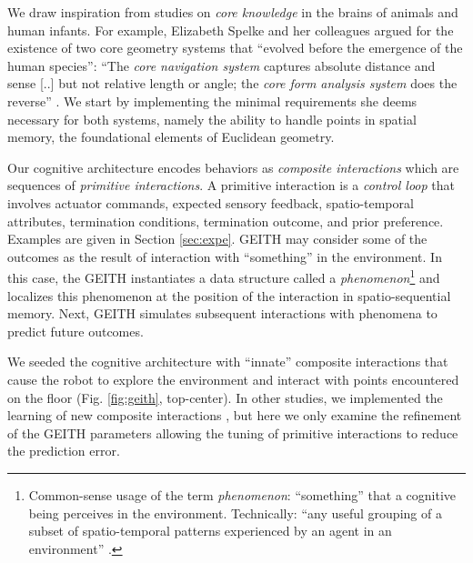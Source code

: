 \documentclass[runningheads]{llncs}
\begin{document}
We draw inspiration from studies on \textit{core knowledge} in the brains of animals and human infants. 
For example, Elizabeth Spelke and her colleagues argued for the existence of two core geometry systems that ``evolved before the emergence of the human species'':  
``The \textit{core navigation system} captures absolute distance and sense [..] but not relative length or angle; the \textit{core form analysis system} does the reverse'' \cite[p. 2789]{spelke_core_2012}.
We start by implementing the minimal requirements she deems necessary for both systems, namely the ability to handle points in spatial memory, the foundational elements of Euclidean geometry. 

Our cognitive architecture encodes behaviors as \textit{composite interactions} which are sequences of \textit{primitive interactions}.
A primitive interaction is a \textit{control loop} that involves actuator commands, expected sensory feedback, spatio-temporal attributes, termination conditions, termination outcome, and prior preference. 
Examples are given in Section \ref{sec:expe}. 
 GEITH may consider some of the outcomes as the result of interaction with ``something'' in the environment.
In this case, the GEITH instantiates a data structure called a \textit{phenomenon}\footnote{Common-sense usage of the term \textit{phenomenon}: ``something'' that a cognitive being perceives in the environment. Technically: ``any useful grouping of a subset of spatio-temporal patterns experienced by an agent in an environment'' \cite[p. 8]{thorisson_explanation_2021}.} and localizes this phenomenon at the position of the interaction in spatio-sequential memory.
Next, GEITH simulates subsequent interactions with phenomena to predict future outcomes. 

We seeded the cognitive architecture with ``innate'' composite interactions that cause the robot to explore the environment and interact with points encountered on the floor (Fig. \ref{fig:geith}, top-center). 
In other studies, we implemented the learning of new composite interactions \cite{georgeon_cash_2019}, but here we only examine the refinement of the GEITH parameters allowing the tuning of primitive interactions to reduce the prediction error.
\end{document}
